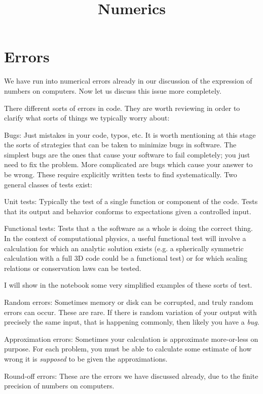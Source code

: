 \title{Numerics}

\section{Errors}

We have run into numerical errors already in our discussion of the
expression of numbers on computers. Now let us discuss this issue more
completely. 

There different sorts of errors in code. They are worth reviewing in
order to clarify what sorts of things we typically worry about:
\begin{ditemize}
\item Bugs: Just mistakes in your code, typos, etc. It is worth
  mentioning at this stage the sorts of strategies that can be taken
  to minimize bugs in software. The simplest bugs are the ones that
  cause your software to fail completely; you just need to fix the
  problem. More complicated are bugs which cause your answer to be
  wrong. These require explicitly written tests to find
  systematically. Two general classes of tests  exist:
  \begin{ditemize}
    \item Unit tests: Typically the test of a single function or
      component of the code. Tests that its output and behavior
      conforms to expectations given a controlled input.
    \item Functional tests: Tests that a the software as a whole is
      doing the correct thing. In the context of computational
      physics, a useful functional test will involve a calculation for
      which an analytic solution exists (e.g. a spherically symmetric
      calculation with a full 3D code could be a functional test) or
      for which scaling relations or conservation laws can be tested.
  \end{ditemize}
  I will show in the notebook some very simplified examples of these
  sorts of test.
\item Random errors: Sometimes memory or disk can be corrupted, and
  truly random errors can occur. These are rare. If there is random
  variation of your output with precisely the same input, that is
  happening commonly, then likely you have a {\it bug}.
\item Approximation errors: Sometimes your calculation is approximate
  more-or-less on purpose. For each problem, you must be able to
  calculate some estimate of how wrong it is {\it supposed} to be
  given the approximations.
\item Round-off errors: These are the errors we have discussed
  already, due to the finite precision of numbers on computers. 
\end{ditemize}

